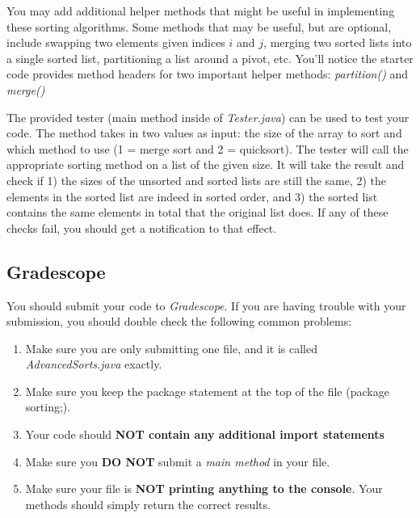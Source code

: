 \documentclass[paper=a4, fontsize=11pt, parskip=full]{scrartcl} %
\numberwithin{equation}{section} %
\numberwithin{figure}{section} %
\numberwithin{table}{section} %
\begin{document}
You may add additional helper methods that might be useful in implementing these sorting algorithms. Some methods that may be useful, but are optional, include swapping two elements given indices $i$ and $j$, merging two sorted lists into a single sorted list, partitioning a list around a pivot, etc. You'll notice the starter code provides method headers for two important helper methods: \emph{partition()} and \emph{merge()}

The provided tester (main method inside of \emph{Tester.java}) can be used to test your code. The method takes in two values as input: the size of the array to sort and which method to use (1 = merge sort and 2 = quicksort). The tester will call the appropriate sorting method on a list of the given size. It will take the result and check if 1) the sizes of the unsorted and sorted lists are still the same, 2) the elements in the sorted list are indeed in sorted order, and 3) the sorted list contains the same elements in total that the original list does. If any of these checks fail, you should get a notification to that effect.


\subsection{Gradescope}

You should submit your code to \emph{Gradescope}. If you are having trouble with your submission, you should double check the following common problems:

\begin{enumerate}
  \item Make sure you are only submitting one file, and it is called \emph{AdvancedSorts.java} exactly.
  \item Make sure you keep the package statement at the top of the file (package sorting;).
  \item Your code should \textbf{NOT contain any additional import statements}
  \item Make sure you \textbf{DO NOT} submit a \emph{main method} in your file.
  \item Make sure your file is \textbf{NOT printing anything to the console}. Your methods should simply return the correct results.
\end{enumerate}


\end{document}
